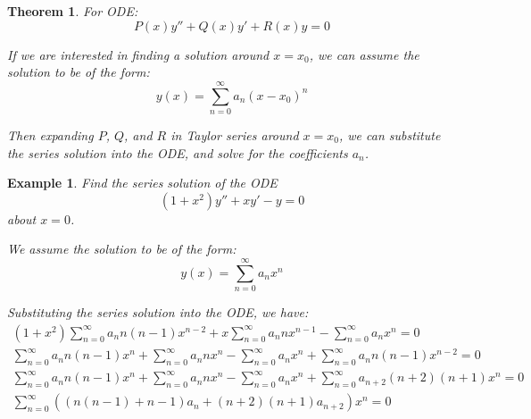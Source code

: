 \documentclass{article}
\newtheorem{theorem}{Theorem}[section]
\newtheorem{example}{Example}[section]
\begin{document}
\begin{enumerate}
\begin{theorem}
              For ODE:
              \begin{equation}
                  P(x) y'' + Q(x) y' + R(x) y = 0
              \end{equation}

              If we are interested in finding a solution around $x = x_0$,
              we can assume the solution to be of the form:
              \begin{equation}
                  y(x) = \sum_{n=0}^{\infty} a_n (x - x_0)^n
              \end{equation}

              Then expanding $P$, $Q$, and $R$ in Taylor series around $x = x_0$,
              we can substitute the series solution into the ODE,
              and solve for the coefficients $a_n$.
          \end{theorem}
          \begin{example}
              Find the series solution of the ODE
              \begin{equation}
                  (1+x^2) y'' + x y' - y = 0
              \end{equation}
              about $x = 0$.

              We assume the solution to be of the form:
              \begin{equation}
                  y(x) = \sum_{n=0}^{\infty} a_n x^n
              \end{equation}

              Substituting the series solution into the ODE,
              we have:
              \begin{eqnarray}
                  (1+x^2) \sum_{n=0}^{\infty} a_n n (n-1) x^{n-2}
                  + x \sum_{n=0}^{\infty} a_n n x^{n-1}
                  - \sum_{n=0}^{\infty} a_n x^n = 0 \\
                  \sum_{n=0}^{\infty} a_n n (n-1) x^n
                  + \sum_{n=0}^{\infty} a_n n x^n
                  - \sum_{n=0}^{\infty} a_n x^n
                  + \sum_{n=0}^{\infty} a_n n (n-1) x^{n-2}
                  = 0 \\
                  \sum_{n=0}^{\infty} a_n n (n-1) x^n
                  + \sum_{n=0}^{\infty} a_n n x^n
                  - \sum_{n=0}^{\infty} a_n x^n
                  + \sum_{n=0}^{\infty} a_{n+2} (n+2) (n+1) x^{n}
                  = 0 \\
                  \sum_{n=0}^{\infty} \left(
                  \left(
                  n (n-1) + n - 1
                  \right)
                  a_n
                  + (n+2) (n+1) a_{n+2}
                  \right) x^n
                  = 0
              \end{eqnarray}


\end{example}
\end{enumerate}
\end{document}
